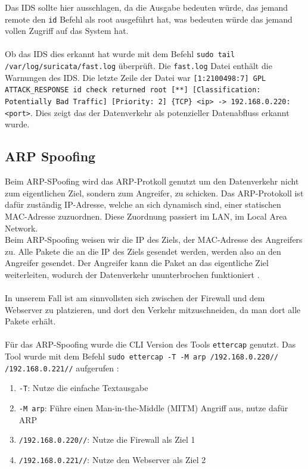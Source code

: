 \documentclass[
    a4paper,
    pagesize,
	pdftex,
    12pt,
]{scrartcl}
\begin{document}
Das IDS sollte hier ausschlagen, da die Ausgabe bedeuten würde, das jemand remote den \lstinline[breaklines]|id| Befehl als root ausgeführt hat, was bedeuten würde das jemand vollen Zugriff auf das System hat. \\ \\
Ob das IDS dies erkannt hat wurde mit dem Befehl
\lstinline[breaklines]|sudo tail /var/log/suricata/fast.log| 
überprüft. Die \lstinline[breaklines]|fast.log| Datei enthält die Warnungen des IDS. 
Die letzte Zeile der Datei war \lstinline[breaklines]|[1:2100498:7] GPL ATTACK_RESPONSE id check returned root [**] [Classification: Potentially Bad Traffic] [Priority: 2] {TCP} <ip> -> 192.168.0.220:<port>|. Dies zeigt das der Datenverkehr als potenzieller Datenabfluss erkannt wurde.

\subsection{ARP Spoofing}
Beim ARP-SPoofing wird das ARP-Protkoll genutzt um den Datenverkehr nicht zum eigentlichen Ziel, sondern zum Angreifer, zu schicken. Das ARP-Protokoll ist dafür zuständig IP-Adresse, welche an sich dynamisch sind, einer statischen MAC-Adresse zuzuordnen. Diese Zuordnung passiert im LAN, im Local Area Network. \\
Beim ARP-Spoofing weisen wir die IP des Ziels, der MAC-Adresse des Angreifers zu. Alle Pakete die an die IP des Ziels gesendet werden, werden also an den Angreifer gesendet. Der Angreifer kann die Paket an das eigentliche Ziel weiterleiten, wodurch der Datenverkehr ununterbrochen funktioniert \cite{what-is-arp-spoofing}. \\ \\
In unserem Fall ist am sinnvollsten sich zwischen der Firewall und dem Webserver zu platzieren, und dort den Verkehr mitzuschneiden, da man dort alle Pakete erhält. \\ \\
Für das ARP-Spoofing wurde die CLI Version des Tools \lstinline[breaklines]|ettercap| genutzt. Das Tool wurde mit dem Befehl \lstinline[breaklines]|sudo ettercap -T -M arp /192.168.0.220// /192.168.0.221//| aufgerufen \cite{ettercap-manual}:
\begin{enumerate}
	\item \lstinline[breaklines]|-T|: Nutze die einfache Textausgabe
	\item \lstinline[breaklines]|-M arp|: Führe einen Man-in-the-Middle (MITM) Angriff aus, nutze dafür ARP
	\item \lstinline[breaklines]|/192.168.0.220//|: Nutze die Firewall als Ziel 1
	\item \lstinline[breaklines]|/192.168.0.221//|: Nutze den Webserver als Ziel 2
\end{enumerate}
\end{document}

